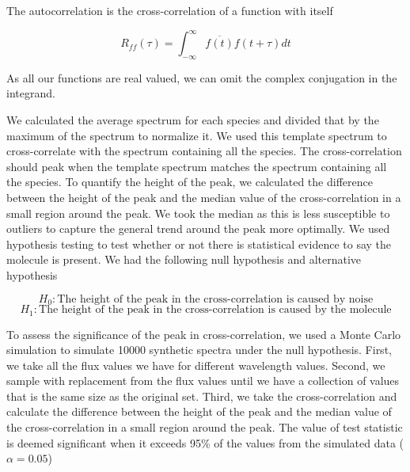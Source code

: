 \documentclass[twoside, single, authoryear, semicolon]{lion-msc}
\newcommand{\4}{$_4$}
\newcommand{\3}{$_3$}
\newcommand{\2}{$_2$}
\begin{document}
The autocorrelation is the cross-correlation of a function with itself

\begin{equation}
    R_{ff}(\tau)=\int^\infty_{-\infty}\overline{f(t)}f(t+\tau)dt
\end{equation}

As all our functions are real valued, we can omit the complex conjugation in the integrand.

We calculated the average spectrum for each species and divided that by the maximum of the spectrum to normalize it. We used this template spectrum to cross-correlate with the spectrum containing all the species. The cross-correlation should peak when the template spectrum matches the spectrum containing all the species. To quantify the height of the peak, we calculated the difference between the height of the peak and the median value of the cross-correlation in a small region around the peak. We took the median as this is less susceptible to outliers to capture the general trend around the peak more optimally. We used hypothesis testing to test whether or not there is statistical evidence to say the molecule is present. We had the following null hypothesis and alternative hypothesis

\begin{equation}
    H_0: \text{The height of the peak in the cross-correlation is caused by noise}
\end{equation}
\begin{equation}
    H_1: \text{The height of the peak in the cross-correlation is caused by the molecule}
\end{equation}

To assess the significance of the peak in cross-correlation, we used a Monte Carlo simulation to simulate 10000 synthetic spectra under the null hypothesis. First, we take all the flux values we have for different wavelength values. Second, we sample with replacement from the flux values until we have a collection of values that is the same size as the original set. Third, we take the cross-correlation and calculate the difference between the height of the peak and the median value of the cross-correlation in a small region around the peak. The value of test statistic is deemed significant when it exceeds 95\% of the values from the simulated data ($\alpha=0.05$)
\end{document}
